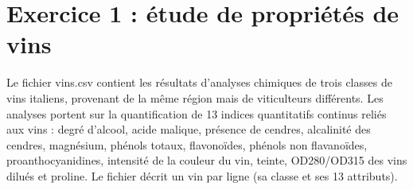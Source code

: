 \documentclass[letterpaper,10pt,french]{sphinxmanual}
\begin{document}
\chapter{Exercice 1 : étude de propriétés de vins}
\label{\detokenize{TP2_ACP:exercice-1-etude-de-proprietes-de-vins}}
\sphinxAtStartPar
Le fichier vins.csv contient les résultats d’analyses chimiques de trois classes de vins italiens, provenant de la même région mais de viticulteurs différents. Les analyses portent sur la quantification de 13 indices quantitatifs continus reliés aux vins : degré d’alcool, acide malique, présence de cendres, alcalinité des cendres, magnésium, phénols totaux, flavonoïdes, phénols non flavanoïdes, proanthocyanidines, intensité de la couleur du vin, teinte, OD280/OD315 des vins dilués et proline. Le fichier décrit un vin par ligne (sa classe et ses 13 attributs).
\end{document}
